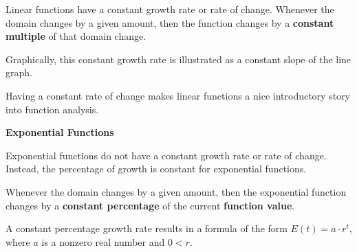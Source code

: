 \documentclass{ximera}
\begin{document}
Linear functions have a constant growth rate or rate of change.  Whenever the domain changes by a given amount, then the function changes by a \textbf{\textcolor{purple!85!blue}{constant multiple}} of that domain change. 

Graphically, this constant growth rate is illustrated as a constant slope of the line graph.

Having a constant rate of change makes linear functions a nice introductory story into function analysis.  




\textbf{\textcolor{blue!55!black}{Exponential Functions}}


Exponential functions do not have a constant growth rate or rate of change. Instead, the percentage of growth is constant for exponential functions.


Whenever the domain changes by a given amount, then the exponential function changes by a \textbf{\textcolor{blue!55!black}{constant percentage}} of the current \textbf{\textcolor{blue!55!black}{function value}}.  

A constant percentage growth rate results in a formula of the form $E(t) = a \cdot r^t$, where $a$ is a nonzero real number and $0 < r$. 
\end{document}
